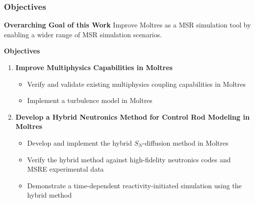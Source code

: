 \begin{frame}
  \frametitle{Objectives}
  \begin{block}{\textbf{Overarching Goal of this Work}}
    Improve Moltres as a MSR simulation tool by enabling a wider range of MSR simulation
    scenarios.
  \end{block}
  \begin{block}{\textbf{Objectives}}
    \begin{enumerate}
      \item \textbf{Improve Multiphysics Capabilities in Moltres}
      \begin{itemize}
        \item Verify and validate existing multiphysics coupling capabilities in Moltres
        \item Implement a turbulence model in Moltres
      \end{itemize}
      \item \textbf{Develop a Hybrid Neutronics Method for Control Rod Modeling in Moltres}
      \begin{itemize}
        \item Develop and implement the hybrid $S_N$-diffusion method in Moltres
        \item Verify the hybrid method against high-fidelity neutronics codes and MSRE
          experimental data
        \item Demonstrate a time-dependent reactivity-initiated simulation using the hybrid
          method
      \end{itemize}
    \end{enumerate}
  \end{block}
\end{frame}
